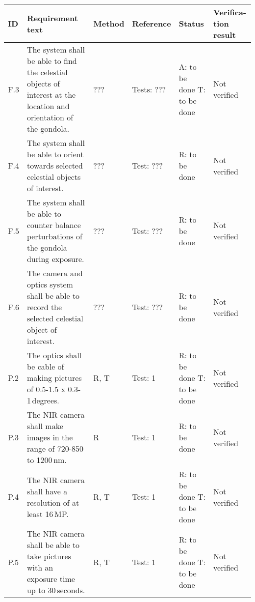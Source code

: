 
\makeatletter
\renewcommand\@makefntext[1]{\leftskip=3em\hskip-1em\@makefnmark#1}
\makeatother

\begin{longtable}[]{|m{}| m{}|m{}|m{}|m{}|m{}|}

\hline
\textbf{ID} & \textbf{Requirement text} & \textbf{Method} & \textbf{Reference} & \textbf{Status} & \textbf{Verifica-tion result} \\\hline

\rowcolor{yellow} F.3 & The system shall be able to find the celestial objects of interest at the location and orientation of the gondola.
& ??? & Tests: ??? & A: to be done \newline T: to be done & Not verified \\\hline

\rowcolor{yellow} F.4 & The system shall be able to orient towards selected celestial objects of interest.
& ??? & Test: ??? & R: to be done & Not verified \\\hline

\rowcolor{yellow} F.5 & The system shall be able to counter balance perturbations of the gondola during exposure.
& ??? & Test: ??? & R: to be done & Not verified \\\hline

\rowcolor{yellow} F.6 & The camera and optics system shall be able to record the selected celestial object of interest.
& ??? & Test: ??? & R: to be done & Not verified \\\hline




P.2 & The optics shall be cable of making pictures of 0.5-1.5 x 0.3-1\,degrees.
& R, T & Test: 1 & R: to be done \newline T: to be done & Not verified \\\hline

P.3 & The NIR camera shall make images in the range of 720-850 to 1200\,nm.
& R & Test: 1 & R: to be done & Not verified \\\hline

P.4 & The NIR camera shall have a resolution of at least 16\,MP.
& R, T & Test: 1 & R: to be done \newline T: to be done & Not verified \\\hline

P.5 & The NIR camera shall be able to take pictures with an exposure time up to 30\,seconds.
& R, T & Test: 1 & R: to be done \newline T: to be done & Not verified \\\hline


\end{longtable}
